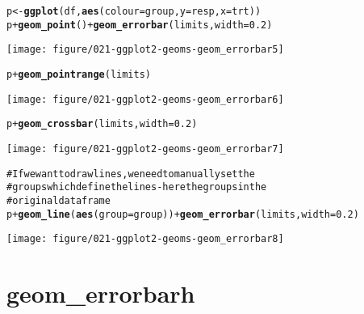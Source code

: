 \documentclass[a4paper,titlepage]{tufte-handout}\usepackage{graphicx, color}
\makeatletter
\def\maxwidth{ %
  \ifdim\Gin@nat@width>\linewidth
    \linewidth
  \else
    \Gin@nat@width
  \fi
}
\newcommand{\hlfunctioncall}[1]{\textcolor[rgb]{0.501960784313725,0,0.329411764705882}{\textbf{#1}}}%
\newcommand{\hlcomment}[1]{\textcolor[rgb]{0.180392156862745,0.6,0.341176470588235}{#1}}%
\newenvironment{kframe}{%
 \def\at@end@of@kframe{}%
 \ifinner\ifhmode%
  \def\at@end@of@kframe{\end{minipage}}%
  \begin{minipage}{\columnwidth}%
 \fi\fi%
 \def\FrameCommand##1{\hskip\@totalleftmargin \hskip-\fboxsep
 \colorbox{shadecolor}{##1}\hskip-\fboxsep
     \hskip-\linewidth \hskip-\@totalleftmargin \hskip\columnwidth}%
 \MakeFramed {\advance\hsize-\width
   \@totalleftmargin\z@ \linewidth\hsize
   \@setminipage}}%
 {\par\unskip\endMakeFramed%
 \at@end@of@kframe}
\newenvironment{knitrout}{}{} %
\makeatother
\begin{document}
\begin{knitrout}
\begin{kframe}
\begin{alltt}
p <- \hlfunctioncall{ggplot}(df, \hlfunctioncall{aes}(colour=group, y=resp, x=trt))
p + \hlfunctioncall{geom_point}() + \hlfunctioncall{geom_errorbar}(limits, width=0.2)
\end{alltt}
\end{kframe}
\texttt{[image: figure/021-ggplot2-geoms-geom\_errorbar5]} 
\begin{kframe}\begin{alltt}
p + \hlfunctioncall{geom_pointrange}(limits)
\end{alltt}
\end{kframe}
\texttt{[image: figure/021-ggplot2-geoms-geom\_errorbar6]} 
\begin{kframe}\begin{alltt}
p + \hlfunctioncall{geom_crossbar}(limits, width=0.2)
\end{alltt}
\end{kframe}
\texttt{[image: figure/021-ggplot2-geoms-geom\_errorbar7]} 
\begin{kframe}\begin{alltt}

\hlcomment{# If we want to draw lines, we need to manually set the}
\hlcomment{# groups which define the lines - here the groups in the}
\hlcomment{# original dataframe}
p + \hlfunctioncall{geom_line}(\hlfunctioncall{aes}(group=group)) + \hlfunctioncall{geom_errorbar}(limits, width=0.2)
\end{alltt}
\end{kframe}
\texttt{[image: figure/021-ggplot2-geoms-geom\_errorbar8]} 
\begin{kframe}\begin{alltt}


\end{alltt}
\end{kframe}
\end{knitrout}



\section{geom\_errorbarh}
\end{document}
